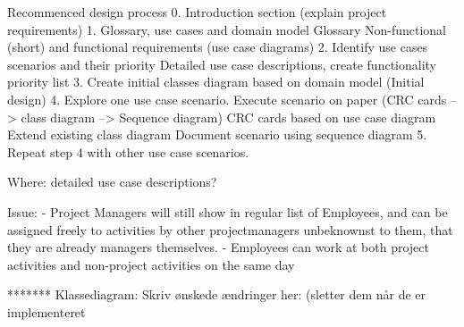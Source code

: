 
Recommenced design process
0. Introduction section (explain project requirements)
1. Glossary, use cases and domain model
    Glossary
    Non-functional (short) and functional requirements (use case diagrams)
2. Identify use cases scenarios and their priority
    Detailed use case descriptions, create functionality priority list
3. Create initial classes diagram based on domain model (Initial design)
4. Explore one use case scenario.
    Execute scenario on paper (CRC cards --> class diagram --> Sequence diagram)
    CRC cards based on use case diagram
    Extend existing class diagram
    Document scenario using sequence diagram
5. Repeat step 4 with other use case scenarios.

Where: detailed use case descriptions?

Issue: 
- Project Managers will still show in regular list of Employees, and can be assigned freely to activities by other projectmanagers unbeknownst to them, that they are already managers themselves. 
- Employees can work at both project activities and non-project activities on the same day 

*******
Klassediagram: Skriv ønskede ændringer her: (sletter dem når de er implementeret

